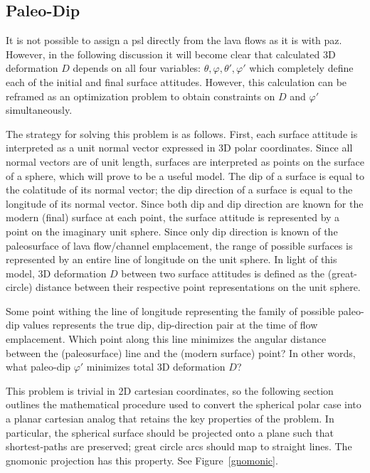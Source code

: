 \subsection{Paleo-Dip}\label{paleo-dip}

It is not possible to assign a \acf{psl} directly from the lava flows as it is with \acf{paz}. However, in the following discussion it will become clear that calculated 3D deformation $D$ depends on all four variables: $\theta,\varphi,\theta',\varphi'$ which completely define each of the initial and final surface attitudes. However, this calculation can be reframed as an optimization problem to obtain constraints on $D$ and $\varphi'$ simultaneously.

The strategy for solving this problem is as follows. First, each surface attitude is interpreted as a unit normal vector expressed in 3D polar coordinates. Since all normal vectors are of unit length, surfaces are interpreted as points on the surface of a sphere, which will prove to be a useful model. The dip of a surface is equal to the colatitude of its normal vector; the dip direction of a surface is equal to the longitude of its normal vector. Since both dip and dip direction are known for the modern (final) surface at each point, the surface attitude is represented by a point on the imaginary unit sphere. Since only dip direction is known of the paleosurface of lava flow/channel emplacement, the range of possible surfaces is represented by an entire line of longitude on the unit sphere. In light of this model, 3D deformation $D$ between two surface attitudes is defined as the (great-circle) distance between their respective point representations on the unit sphere.

Some point withing the line of longitude representing the family of possible paleo-dip values represents the true dip, dip-direction pair at the time of flow emplacement. Which point along this line minimizes the angular distance between the (paleosurface) line and the (modern surface) point? In other words, what paleo-dip $\varphi'$ minimizes total 3D deformation $D$?

This problem is trivial in 2D cartesian coordinates, so the following section outlines the mathematical procedure used to convert the spherical polar case into a planar cartesian analog that retains the key properties of the problem. In particular, the spherical surface should be projected onto a plane such that shortest-paths are preserved; great circle arcs should map to straight lines. The gnomonic projection has this property. See Figure~\ref{gnomonic}.

